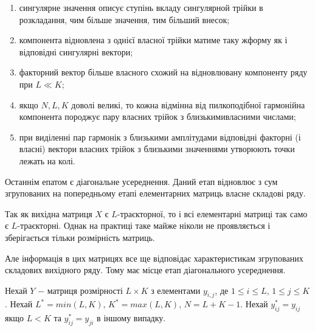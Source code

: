\begin{enumerate}
	\item сингулярне значення описує ступінь вкладу сингулярной трійки в\newline 
\hspace*{-18mm}розкладання, чим більше значення, тим більший внесок;
	\item компонента відновлена з однієї власної трійки матиме таку ж\newline \hspace*{-18mm}форму як і відповідні сингулярні вектори;
	\item факторний вектор більше власного схожий на відновлювану\newline
\hspace*{-18mm}компоненту ряду при $L \ll K$;
	\item якщо $N, L, K$ доволі великі, то кожна відмінна від пилкоподібної\newline
\hspace*{-18mm}гармонійна компонента породжує пару власних трійок з близькими\newline \hspace*{-18mm}власними числами;
	\item при виділенні пар гармонік з близькими амплітудами відповідні\newline
\hspace*{-18mm}факторні (і власні) вектори власних трійок з близькими значеннями\newline
\hspace*{-18mm}утворюють точки лежать на колі.
\end{enumerate}


Останнім епатом є діагональне усереднення.
Даний етап відновлює з сум згрупованих на попередньому етапі елементарних матриць власне складові ряду.

Так як вихідна матриця $X$ є $L$-траєкторної, то і всі елементарні матриці так само є $L$-траєкторні. Однак на практиці таке майже ніколи не проявляється і зберігається тільки розмірність матриць.

Але інформація в цих матрицях все ще відповідає характеристикам згрупованих складових вихідного ряду. Тому має місце етап діагонального усереднення.

Нехай $Y$ $-$ матриця розмірності $L \times K$ з елементами $y_{i,j}$, де $1 \le i \le L$, $1 \le j \le K$. Нехай $L^{*} = min(L, K), \, K^{*} = max(L,K), \, N = L + K - 1$. Нехай $y_{ij}^{*} = y_{ij}$ якщо $L < K$ та $y_{ij}^{*} = y_{ji}$ в іншому випадку.

